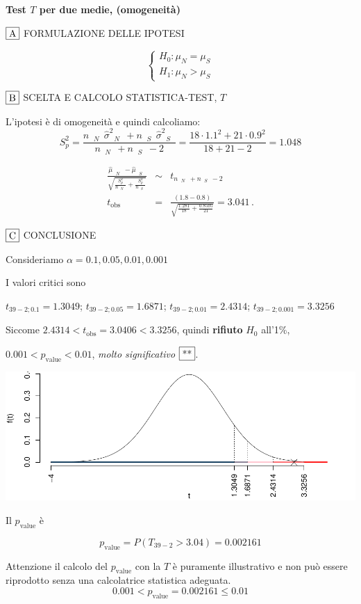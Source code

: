 \documentclass[
  11pt,
]{book}
\theoremstyle{mytheoremstyle}
\theoremstyle{mydefstyle}
\newenvironment{sol}
  {
  \begin{tcolorbox}[enhanced,breakable,arc=0.1mm,boxrule=1pt,colback=white,colframe=iblue,
  title=\bf \fontfamily{lmss}\selectfont \hspace{.5 cm} Soluzione,drop fuzzy shadow]

}{
\end{tcolorbox}
  }
\begin{document}
\begin{sol}
\textbf{Test \(T\) per due medie, (omogeneità)}

\(\fbox{A}\) FORMULAZIONE DELLE IPOTESI

\[\begin{cases}
   H_0: \mu_\text{$N$} = \mu_\text{$S$} \\
   H_1: \mu_\text{$N$} > \mu_\text{$S$} 
   \end{cases}\]

\(\fbox{B}\) SCELTA E CALCOLO STATISTICA-TEST, \(T\)

L'ipotesi è di omogeneità e quindi calcoliamo:\[
   S_p^2=\frac{n_\text{ $N$ }\hat\sigma^2_\text{ $N$ }+n_\text{ $S$ }\hat\sigma^2_\text{ $S$ }}{n_\text{ $N$ }+n_\text{ $S$ }-2} =
   \frac{ 18 \cdot 1.1 ^2+ 21 \cdot 0.9 ^2}{ 18 + 21 -2}= 1.048 
  \]

\begin{eqnarray*}
  \frac{\hat\mu_\text{ $N$ } - \hat\mu_\text{ $S$ }}
  {\sqrt{\frac {S^2_p}{n_\text{ $N$ }}+\frac {S^2_p}{n_\text{ $S$ }}}}&\sim&t_{n_\text{ $N$ }+n_\text{ $S$ }-2}\\
  t_{\text{obs}}
  &=& \frac{ ( 1.8 -  0.8 )} {\sqrt{\frac{ 1.281 }{ 18 }+\frac{ 0.8505 }{ 21 }}}
  =   3.041 \, .
  \end{eqnarray*}

\(\fbox{C}\) CONCLUSIONE

Consideriamo \(\alpha=0.1, 0.05, 0.01, 0.001\)

I valori critici sono

\(t_{39-2;0.1}=1.3049\); \(t_{39-2;0.05}=1.6871\); \(t_{39-2;0.01}=2.4314\); \(t_{39-2;0.001}=3.3256\)

Siccome \(2.4314<t_\text{obs}=3.0406<3.3256\), quindi \textbf{rifiuto} \(H_0\) all'1\%,

\(0.001<p_\text{value}<0.01\), \emph{molto significativo} \(\fbox{**}\).

\begin{center}\includegraphics{Esami_passati_con_soluzioni_files/figure-latex/2024-102-1} \end{center}

Il \(p_{\text{value}}\) è

\[ p_{\text{value}} = P(T_{39-2}>3.04)=0.002161 \]

Attenzione il calcolo del \(p_\text{value}\) con la \(T\) è puramente illustrativo e non può essere riprodotto senza una calcolatrice statistica adeguata.\[
 0.001 < p_\text{value}= 0.002161 \leq 0.01 
\]

\end{sol}
\end{document}
